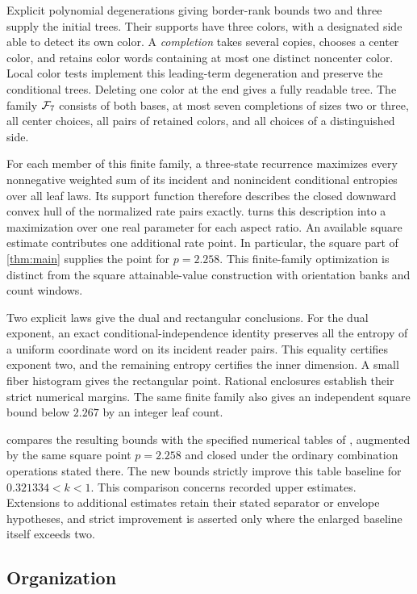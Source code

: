 Explicit polynomial degenerations giving border-rank bounds two and
three supply the initial trees.  Their supports have three colors, with a
designated side able to detect its own color.  A \emph{completion}
takes several copies, chooses a center color, and retains color words
containing at most one distinct noncenter color.  Local color tests
implement this leading-term degeneration and preserve the conditional trees.
Deleting one color at the end gives a fully readable tree.
The family \(\mathcal F_7\) consists of both bases, at most seven
completions of sizes two or three, all center choices, all pairs of
retained colors, and all choices of a distinguished side.

For each member of this finite family, a three-state recurrence
maximizes every nonnegative weighted sum of its incident and
nonincident conditional entropies over all leaf laws.  Its support
function therefore describes the closed downward convex hull of the
normalized rate pairs exactly.   turns
this description into a maximization over one real parameter for
each aspect ratio.  An available square estimate contributes one
additional rate point.  In particular, the square part of
\cref{thm:main} supplies the point for \(p=2.258\).
This finite-family optimization is distinct from the square
attainable-value construction with orientation banks and count windows.

Two explicit laws give the dual and rectangular conclusions.
For the dual exponent, an exact conditional-independence identity
preserves all the entropy of a uniform coordinate word on its incident
reader pairs.  This equality certifies exponent two, and the remaining
entropy certifies the inner dimension.  A small fiber histogram gives
the rectangular point.  Rational enclosures establish their strict
numerical margins.  The same finite family also gives an independent
square bound below \(2.267\) by an integer leaf count.

 compares the resulting bounds with the
specified numerical tables of \cite{vxxz,advxxz}, augmented by the
same square point \(p=2.258\) and closed under the ordinary
combination operations stated there.  The new bounds strictly improve
this table baseline for \(0.321334<k<1\).  This comparison concerns
recorded upper estimates.  Extensions to additional estimates retain
their stated separator or envelope hypotheses, and strict improvement
is asserted only where the enlarged baseline itself exceeds two.

\subsection{Organization}

